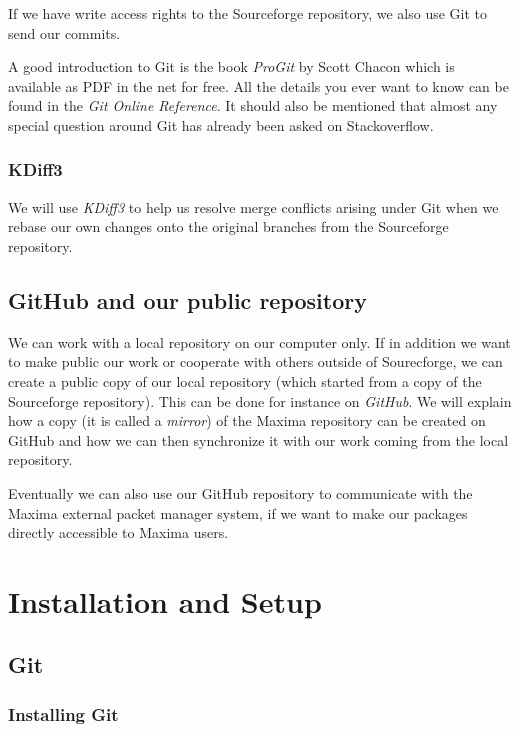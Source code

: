 \documentclass[../Maxima_Workbook.tex]{subfiles}
\begin{document}
\lz If we have write access rights to the Sourceforge repository, we also use Git to send our commits.

\lz A good introduction to Git is the book \emph{ProGit} by Scott Chacon which is available as PDF in the net for free. All the details you ever want to know can be found in the \emph{Git Online Reference}. It should also be mentioned that almost any special question around Git has already been asked on Stackoverflow.

\subsubsection{KDiff3}

We will use \emph{KDiff3} to help us resolve merge conflicts arising under Git when we rebase our own changes onto the original branches from the Sourceforge repository.

\subsection{GitHub and our public repository}

We can work with a local repository on our computer only. If in addition we want to make public our work or cooperate with others outside of Sourecforge, we can create a public copy of our local repository (which started from a copy of the Sourceforge repository). This can be done for instance on \emph{GitHub}. We will explain how a copy (it is called a \emph{mirror}) of the Maxima repository can be created on GitHub and how we can then synchronize it with our work coming from the local repository.

\lz Eventually we can also use our GitHub repository to communicate with the Maxima external packet manager system, if we want to make our packages directly accessible to Maxima users.

\section{Installation and Setup}

\subsection{Git}

\subsubsection{Installing Git}
\end{document}
